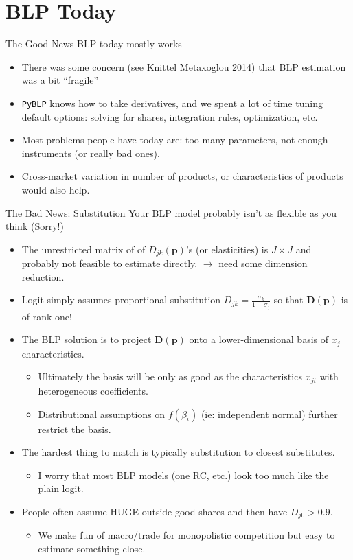 \documentclass[aspectratio=169,10pt]{beamer}
\begin{document}
\section{BLP Today}


\begin{frame}{The Good News}
BLP today mostly works
\begin{itemize}
    \item There was some concern (see Knittel Metaxoglou 2014) that BLP estimation was a bit ``fragile''
    \item \texttt{PyBLP} knows how to take derivatives, and we spent a lot of time tuning default options: solving for shares, integration rules, optimization, etc.
    \item Most problems people have today are: \alert{too many parameters, not enough instruments} (or really bad ones).
    \item Cross-market variation in number of products, or characteristics of products would also help.
\end{itemize}
\end{frame}

\begin{frame}{The Bad News: Substitution}
Your BLP model probably isn't as flexible as you think (Sorry!)
\begin{itemize}
\item The unrestricted matrix of of $D_{jk}(\symbf{p})$'s (or elasticities) is $J \times J$ and probably not feasible to estimate directly. $\rightarrow$ need some \alert{dimension reduction}.
\item Logit simply assumes proportional substitution ${D}_{jk}=\frac{\sigma_k}{1-\sigma_{j}}$ so that $\symbf{D}(\symbf{p})$ is of rank one!
\item The BLP solution is to project $\symbf{D}(\symbf{p})$ onto a lower-dimensional basis of $x_{j}$ characteristics.
\begin{itemize}
\item Ultimately the basis will be only as good as the characteristics $x_{jt}$ with heterogeneous coefficients.
\item Distributional assumptions on $f(\beta_i)$ (ie: independent normal) further restrict the basis.
\end{itemize}
\item The hardest thing to match is typically \alert{substitution to closest substitutes}.
\begin{itemize}
\item I worry that most BLP models (one RC, etc.) look too much like the plain logit.
\end{itemize}
\item People often assume \alert{HUGE outside good shares} and then have $D_{j0}>0.9$.
\begin{itemize}
    \item We make fun of macro/trade for \alert{monopolistic competition} but easy to estimate something close.
\end{itemize}
\end{itemize}

\end{frame}
\end{document}
